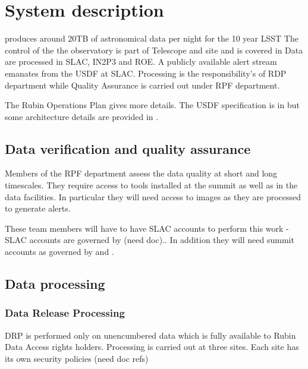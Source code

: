 \section{System description} \label{sec:desc}

\VRO produces around 20TB of astronomical data per night for the 10 year \gls{LSST}
The control of the the observatory is part of Telescope and site and is covered in 
Data are processed in \gls{SLAC}, \gls{IN2P3} and ROE.
A publicly available alert stream emanates from the \gls{USDF} at \gls{SLAC}.
Processing is the responsibility's of \gls{RDP} department while Quality Assurance is carried out under \gls{RPF} department.

The Rubin \gls{Operations} Plan  gives more details.
The USDF specification is in  but some architecture details are provided in .




\subsection{Data verification and quality assurance }
Members of the \gls{RPF} department assess the data quality at short and long timescales.
They require access to tools installed at the summit as well as in the data facilities.
In particular they will need access to images as they are processed to generate alerts.

These team members will have to have \gls{SLAC} accounts to perform this work - \gls{SLAC} accounts are governed by (need doc)..
In addition they will need summit accounts as governed by  and .



\subsection{Data processing}
\subsubsection{Data Release Processing}
DRP is performed only on unencumbered data which is fully available to Rubin Data Access rights holders.
Processing is carried out at three sites.
Each site has its own security policies (need doc refs) 


